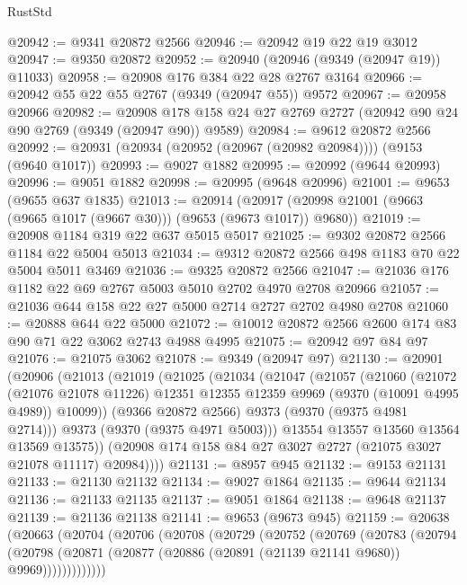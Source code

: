 \begin{lexlean}{RustStd}
\begin{coremodule}
{\begin{coremodule}
{{{{{{{{{{{{{{{{{{{{{{{{{{{{{{{{{{{{{{{@20942 := @9341 @20872 @2566
@20946 := @20942 @19 @22 @19 @3012
@20947 := @9350 @20872
@20952 := @20940 (@20946 (@9349 (@20947 @19)) @11033)
@20958 := @20908 @176 @384 @22 @28 @2767 @3164
@20966 := @20942 @55 @22 @55 @2767 (@9349 (@20947 @55)) @9572
@20967 := @20958 @20966
@20982 := @20908 @178 @158 @24 @27 @2769 @2727 (@20942 @90 @24 @90 @2769 (@9349 (@20947 @90)) @9589)
@20984 := @9612 @20872 @2566
@20992 := @20931 (@20934 (@20952 (@20967 (@20982 @20984)))) (@9153 (@9640 @1017))
@20993 := @9027 @1882
@20995 := @20992 (@9644 @20993)
@20996 := @9051 @1882
@20998 := @20995 (@9648 @20996)
@21001 := @9653 (@9655 @637 @1835)
@21013 := @20914
    (@20917 (@20998 @21001 (@9663 (@9665 @1017 (@9667 @30))) (@9653 (@9673 @1017)) @9680))
@21019 := @20908 @1184 @319 @22 @637 @5015 @5017
@21025 := @9302 @20872 @2566 @1184 @22 @5004 @5013
@21034 := @9312 @20872 @2566 @498 @1183 @70 @22 @5004 @5011 @3469
@21036 := @9325 @20872 @2566
@21047 := @21036 @176 @1182 @22 @69 @2767 @5003 @5010 @2702 @4970 @2708 @20966
@21057 := @21036 @644 @158 @22 @27 @5000 @2714 @2727 @2702 @4980 @2708
@21060 := @20888 @644 @22 @5000
@21072 := @10012 @20872 @2566 @2600 @174 @83 @90 @71 @22 @3062 @2743 @4988 @4995
@21075 := @20942 @97 @84 @97
@21076 := @21075 @3062
@21078 := @9349 (@20947 @97)
@21130 := @20901
    (@20906
      (@21013
        (@21019
          (@21025
            (@21034
              (@21047
                (@21057
                  (@21060
                    (@21072
                      (@21076 @21078 @11226)
                      @12351
                      @12355
                      @12359
                      @9969
                      (@9370 (@10091 @4995 @4989))
                      @10099))
                  (@9366 @20872 @2566)
                  @9373
                  (@9370 (@9375 @4981 @2714)))
                @9373
                (@9370 (@9375 @4971 @5003)))
              @13554
              @13557
              @13560
              @13564
              @13569
              @13575))
          (@20908 @174 @158 @84 @27 @3027 @2727 (@21075 @3027 @21078 @11117) @20984))))
@21131 := @8957 @945
@21132 := @9153 @21131
@21133 := @21130 @21132
@21134 := @9027 @1864
@21135 := @9644 @21134
@21136 := @21133 @21135
@21137 := @9051 @1864
@21138 := @9648 @21137
@21139 := @21136 @21138
@21141 := @9653 (@9673 @945)
@21159 := @20638
    (@20663
      (@20704
        (@20706
          (@20708
            (@20729
              (@20752
                (@20769
                  (@20783
                    (@20794
                      (@20798
                        (@20871 (@20877 (@20886 (@20891 (@21139 @21141 @9680)) @9969)))))))))))))
}}}}}}}}}}}}}}}}}}}}}}}}}}}}}}}}}}}}}}}
\end{coremodule}}
\end{coremodule}
\end{lexlean}
